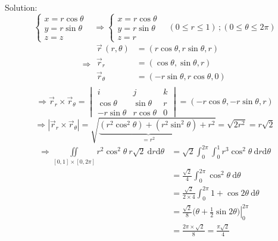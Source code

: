 \documentclass[12pt, fleqn]{book}
\newcommand{\D}{\mathrm{d}}
\begin{document}
			Solution:
			\begin{equation*}
				\begin{cases}
					x = r\cos\theta & \\
					y = r\sin\theta & \\
					z = z
				\end{cases}
				\Rightarrow
				\begin{cases}
					x = r\cos\theta & \\
					y = r\sin\theta & \\
					z= r
				\end{cases}
				\, (0 \le r \le 1) \, ; (0 \le \theta \le 2\pi) 			    	
			\end{equation*}
			\begin{equation*}
				\Rightarrow
				\begin{split}
					\vec{r}\,(r, \theta) 
					& = (r\cos\theta, r\sin\theta, r) \\
					\vec{r}_r      & = (\cos\theta, \sin\theta, r) \\
					\vec{r}_\theta & = (-r\sin\theta, r\cos\theta, 0) \\
				\end{split}
			\end{equation*}
			\begin{equation*}
				\Rightarrow
				\vec{r}_r \times \vec{r}_\theta = 
				\begin{vmatrix}
					i            & j             & k \\
					\cos\theta   & \sin\theta    & r \\
					-r\sin\theta & r\cos\theta & 0
				\end{vmatrix} = (-r\cos\theta, -r\sin\theta, r)
			\end{equation*}
			\begin{equation*}
				\Rightarrow
				\left|\vec{r}_r \times \vec{r}_\theta\right|
				= \sqrt{
					\underbrace{
						(r^2\cos^2\theta) +
						(r^2\sin^2\theta)
					}_{=r^2}
					+ r^2
				}
				= \sqrt{2r^2}
				= r\sqrt{2} 				
			\end{equation*}
			\begin{equation*}
				\begin{split}
					\Rightarrow \iint\limits_{[0, 1] \times [0, 2\pi]}
					r^2\cos^2\theta \ r\sqrt{2} \ \D r \D \theta
					& = \sqrt{2} \int_{0}^{2\pi} \int_{0}^{1} r^3\cos^2\theta \ \D r \D \theta \\
					& = \frac{\sqrt{2}}{4} \int_{0}^{2\pi} \cos^2\theta \ \D \theta \\
					& = \frac{\sqrt{2}}{2 \times 4} \int_{0}^{2\pi} 1 + \cos2\theta \ \D \theta \\
					& = \frac{\sqrt{2}}{8} \left.\big(\theta + \frac{1}{2}\sin2\theta\big)\right|_0^{2\pi} \\
					& = \frac{2\pi \times \sqrt{2}}{8} = \frac{\pi\sqrt{2}}{4}
				\end{split}
			\end{equation*}
\end{document}
